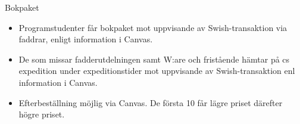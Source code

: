 \documentclass{lecturesimple}
\begin{document}





\begin{Slide}{Bokpaket}
  \begin{itemize}
    \item Programstudenter får bokpaket mot uppvisande av Swish-transaktion via faddrar, enligt information i Canvas.
    \item De som missar fadderutdelningen samt W:are och fristående hämtar på cs expedition under expeditionstider mot uppvisande av Swish-transaktion enl information i Canvas.
    \item Efterbeställning möjlig via Canvas. De första 10 får lägre priset därefter högre priset.
  \end{itemize}
\end{Slide}
\end{document}
